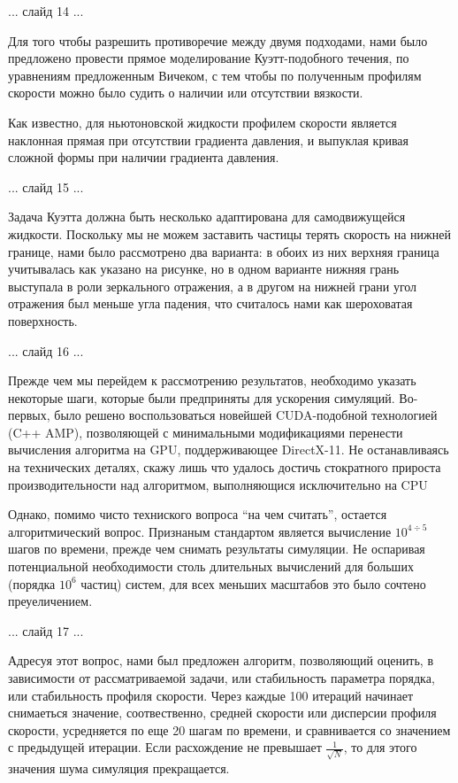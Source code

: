 \documentclass[a4paper,14pt,russian]{extreport}
\begin{document}
  ... слайд 14 ...

  Для того чтобы разрешить противоречие между двумя подходами, нами было предложено провести прямое моделирование Куэтт-подобного течения, по уравнениям предложенным Вичеком, с тем чтобы по полученным профилям скорости можно было судить о наличии или отсутствии вязкости.

  Как известно, для ньютоновской жидкости профилем  скорости является наклонная прямая при отсутствии градиента давления, и выпуклая кривая сложной формы при наличии градиента давления.

  ... слайд 15 ...

  Задача Куэтта должна быть несколько адаптирована для самодвижущейся жидкости. Поскольку мы не можем заставить частицы терять скорость на нижней границе, нами было рассмотрено два варианта: в обоих из них верхняя граница учитывалась как указано на рисунке, но в одном варианте нижняя грань выступала в роли зеркального отражения, а в другом на нижней грани угол отражения был меньше угла падения, что считалось нами как шероховатая поверхность.

  ... слайд 16 ...

  Прежде чем мы перейдем к рассмотрению результатов, необходимо указать некоторые шаги, которые были предприняты для ускорения симуляций. Во-первых, было решено воспользоваться новейшей CUDA-подобной технологией (C++ AMP), позволяющей с минимальными модификациями перенести вычисления алгоритма на GPU, поддерживающее DirectX-11. Не останавливаясь на технических деталях, скажу лишь что удалось достичь стократного прироста производительности над алгоритмом, выполняющися исключительно на CPU

  Однако, помимо чисто техниского вопроса ``на чем считать'', остается алгоритмический вопрос. Признаным стандартом является вычисление $10^{4 \div 5}$ шагов по времени, прежде чем снимать результаты симуляции. Не оспаривая потенциальной необходимости столь длительных вычислений для больших (порядка $10^6$ частиц) систем, для всех меньших масштабов это было сочтено преуеличением.

  ... слайд 17 ...

  Адресуя этот вопрос, нами был предложен алгоритм, позволяющий оценить, в зависимости от рассматриваемой задачи, или стабильность параметра порядка, или стабильность профиля скорости. Через каждые 100 итераций начинает снимаеться значение, соотвественно, средней скорости или дисперсии профиля скорости, усредняется по еще 20 шагам по времени, и сравнивается со значением с предыдущей итерации. Если расхождение не превышает $\frac{1}{\sqrt{N}}$, то для этого значения шума симуляция прекращается.
\end{document}
